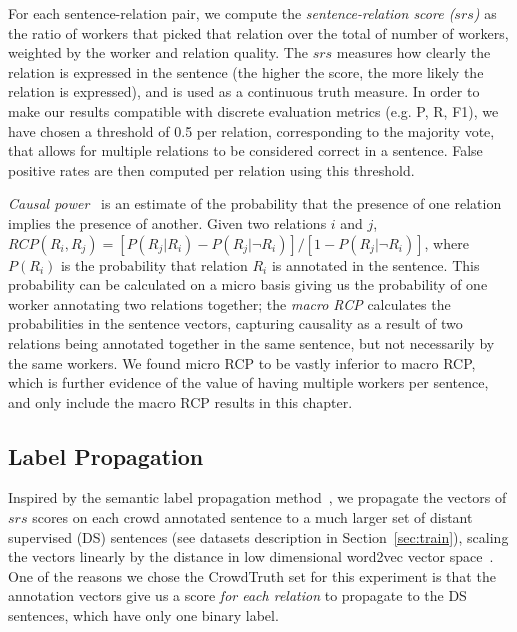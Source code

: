 For each sentence-relation pair, we compute the \textit{sentence-relation score ($srs$)} as the ratio of workers that picked that relation over the total of number of workers, weighted by the worker and relation quality. The $srs$ measures how clearly the relation is expressed in the sentence (the higher the score, the more likely the relation is expressed), and is used as a continuous truth measure. In order to make our results compatible with discrete evaluation metrics (e.g. P, R, F1), we have chosen a threshold of 0.5 per relation, corresponding to the majority vote, that allows for multiple relations to be considered correct in a sentence.  False positive rates are then computed per relation using this threshold.

\textit{Causal power}~\cite{cheng1997causalpower} is an estimate of the probability that the presence of one relation implies the presence of another. Given two relations $i$ and $j$, $ RCP(R_i, R_j) = [ P(R_{j} | R_{i} ) - P(R_{j} | \neg R_{i} ) ] / [1 - P(R_{j} | \neg R_{i} )]$, where $P(R_{i})$ is the probability that relation $R_i$ is annotated in the sentence. This probability can be calculated on a micro basis giving us the probability of one worker annotating two relations together; the \textit{macro RCP} calculates the probabilities in the sentence vectors, capturing causality as a result of two relations being annotated together in the same sentence, but not necessarily by the same workers.  We found micro RCP to be vastly inferior to macro RCP, which is further evidence of the value of having multiple workers per sentence, and only include the macro RCP results in this chapter.


\subsection{Label Propagation}

Inspired by the semantic label propagation method~\cite{sterckx2016knowledge}, we propagate the vectors of $srs$ scores on each crowd annotated sentence to a much larger set of distant supervised (DS) sentences (see datasets description in Section~\ref{sec:train}), scaling the vectors linearly by the distance in low dimensional word2vec vector space~\cite{mikolov2013distributed}.  One of the reasons we chose the CrowdTruth set for this experiment is that the annotation vectors give us a score \emph{for each relation} to propagate to the DS sentences, which have only one binary label.

